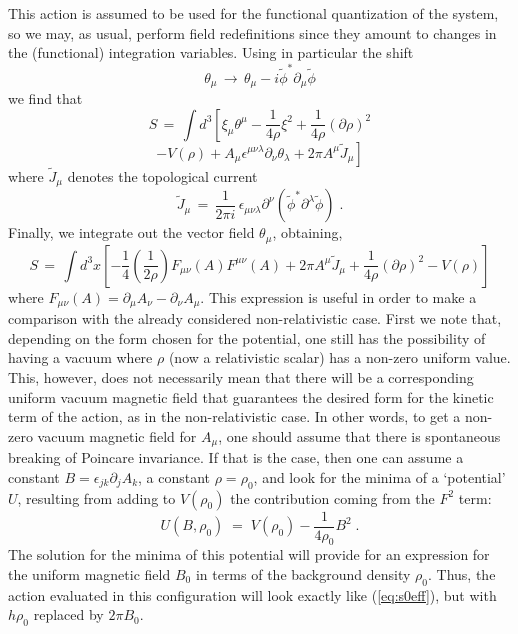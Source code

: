 \documentclass[a4paper,12pt]{article} \tolerance=200
\begin{document}
This action is assumed to be used for the functional quantization of
the system, so we may, as usual, perform field redefinitions since
they amount to changes in the (functional) integration variables.
Using in particular the shift
\begin{equation}
\theta_\mu \,\to \, \theta_\mu - i {\tilde \phi}^* \partial_\mu {\tilde \phi}
\end{equation}
we find that
$$
S\,=\, \int d^3 \left[ \xi_\mu \theta^\mu - \frac{1}{4\rho} \xi^2 + \frac{1}{4 \rho} 
(\partial \rho)^2 \right.  
$$
\begin{equation}
\left. - V(\rho) + A_\mu \epsilon^{\mu\nu\lambda} \partial_\nu \theta_\lambda + 2 \pi  
A^\mu {\tilde J}_\mu \right]
\end{equation}
where ${\tilde J}_\mu$ denotes the topological current
\begin{equation}
{\tilde J}_\mu \,=\, \frac{1}{2\pi i} \, \epsilon_{\mu\nu\lambda} \partial^\nu 
({\tilde \phi}^* \partial^\lambda {\tilde \phi}) \;.
\end{equation}
Finally, we integrate out the vector field $\theta_\mu$, obtaining,
\begin{equation}
S\,=\, \int d^3x \left[ -\frac{1}{4} (\frac{1}{2\rho}) F_{\mu\nu}(A) F^{\mu\nu}(A) 
+ 2 \pi A^\mu {\tilde J}_\mu +\frac{1}{4 \rho} (\partial \rho)^2 - V(\rho) \right]
\end{equation}
where $F_{\mu\nu}(A) = \partial_\mu A_\nu - \partial_\nu A_\mu$.  This expression is useful in
order to make a comparison with the already considered
non-relativistic case. First we note that, depending on the form
chosen for the potential, one still has the possibility of having a
vacuum where $\rho$ (now a relativistic scalar) has a non-zero uniform
value.  This, however, does not necessarily mean that there will be a
corresponding uniform vacuum magnetic field that guarantees the
desired form for the kinetic term of the action, as in the
non-relativistic case. In other words, to get a non-zero vacuum
magnetic field for $A_\mu$, one should assume that there is spontaneous
breaking of Poincare invariance.  If that is the case, then one can
assume a constant $B = \epsilon_{jk} \partial_j A_k$, a constant $\rho = \rho_0$, and look
for the minima of a `potential' $U$, resulting from adding to $V(\rho_0)$
the contribution coming from the $F^2$ term:
\begin{equation}
U(B,\rho_0) \;=\; V(\rho_0) - \frac{1}{4 \rho_0} B^2 \;.
\end{equation}
The solution for the minima of this potential will provide for an
expression for the uniform magnetic field $B_0$ in terms of the
background density $\rho_0$. Thus, the action evaluated in this
configuration will look exactly like (\ref{eq:s0eff}), but
 with $h\rho_0$ replaced by $2\pi B_0$.
 
\end{document}

